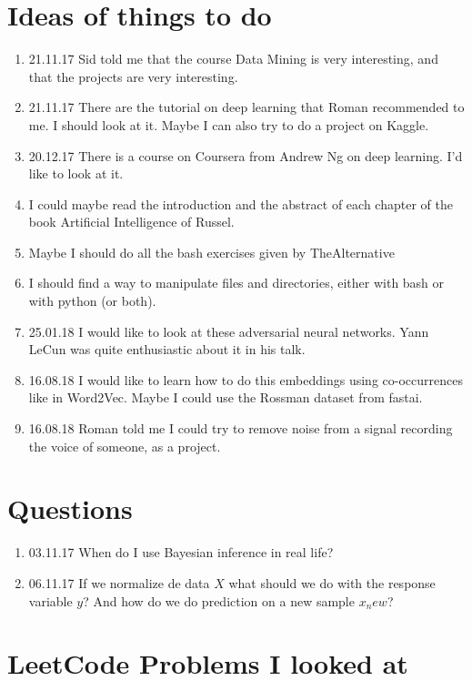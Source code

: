 \documentclass[11pt,a4paper]{article}
\begin{document}
\section{Ideas of things to do}
\begin{enumerate}
\item 21.11.17 Sid told me that the course Data Mining is very interesting, and that the projects are very interesting.
\item 21.11.17 There are the tutorial on deep learning that Roman recommended to me. I should look at it. Maybe I can also try to do a project on Kaggle.
\item 20.12.17 There is a course on Coursera from Andrew Ng on deep learning. I'd like to look at it.
\item I could maybe read the introduction and the abstract of each chapter of the book Artificial Intelligence of Russel.
\item Maybe I should do all the bash exercises given by TheAlternative
\item I should find a way to manipulate files and directories, either with bash or with python (or both).
\item 25.01.18 I would like to look at these adversarial neural networks. Yann LeCun was quite enthusiastic about it in his talk.
\item 16.08.18 I would like to learn how to do this embeddings using co-occurrences like in Word2Vec. Maybe I could use the Rossman dataset from fastai.
\item 16.08.18 Roman told me I could try to remove noise from a signal recording the voice of someone, as a project.
\end{enumerate}

\section{Questions}
\begin{enumerate}
\item 03.11.17 When do I use Bayesian inference in real life?
\item 06.11.17 If we normalize de data $X$ what should we do with the response variable $y$? And how do we do prediction on a new sample $x_new$? 
\end{enumerate}

\section{LeetCode Problems I looked at}
\end{document}
